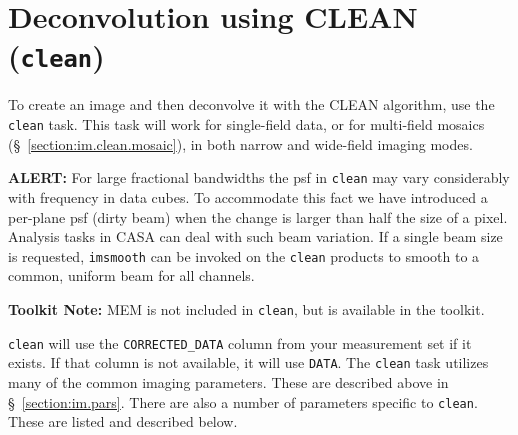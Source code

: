 \section{Deconvolution using CLEAN ({\tt clean})}
\label{section:im.clean}

To create an image and then deconvolve it with the CLEAN algorithm,
use the {\tt clean} task.  This task will work for single-field data,
or for multi-field mosaics (\S~\ref{section:im.clean.mosaic}), in both
narrow and wide-field imaging modes.  


\normalsize {\bf ALERT:} For large fractional bandwidths the psf in
{\tt clean} may vary considerably with frequency in data cubes. To
accommodate this fact we have introduced a per-plane psf (dirty beam)
when the change is larger than half the size of a pixel. Analysis
tasks in CASA can deal with such beam variation. If a single beam size
is requested, {\tt imsmooth} can be invoked on the {\tt clean}
products to smooth to a common, uniform beam for all channels.


{\bf Toolkit Note:} MEM is not included in {\tt clean}, but is
available in the toolkit.

{\tt clean} will use the {\tt CORRECTED\_DATA} column from your
measurement set if it exists. If that column is not available, it will
use {\tt DATA}. The {\tt clean} task utilizes many of the common imaging
parameters.  These are described above in \S~\ref{section:im.pars}.
There are also a number of parameters specific to {\tt clean}.  These
are listed and described below.


